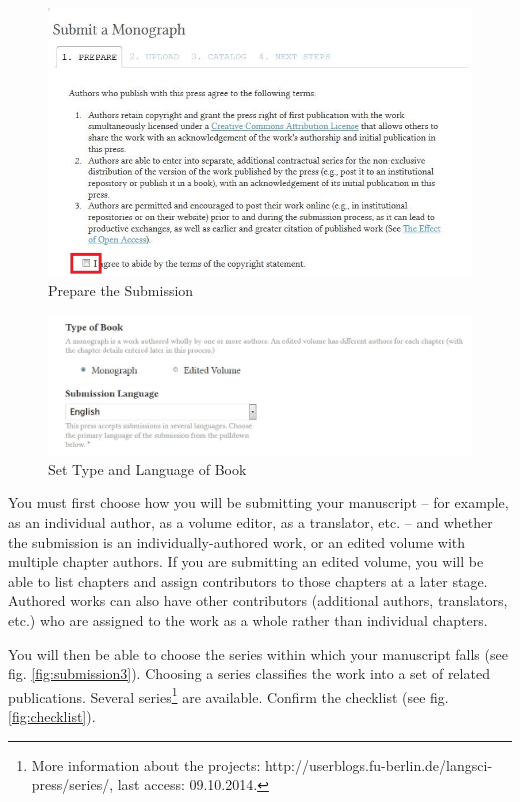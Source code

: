 \begin{figure}[h]
\centering
\includegraphics[width=1\textwidth]{./img/submission-1.jpg}
\caption{Prepare the Submission}
\label{fig:submission1}
\end{figure}

\begin{figure}[h]
\centering
\includegraphics[width=1\textwidth]{./img/submission-2.jpg}
\caption{Set Type and Language of Book}
\label{fig:submission2}
\end{figure}

You must first choose how you will be submitting your manuscript -- for example, as an individual author, as a volume editor, as a translator, etc. -- and whether the submission is an individually-authored work, or an edited volume with multiple chapter authors. If you are submitting an edited volume, you will be able to list chapters and assign contributors to those chapters at a later stage. Authored works can also have other contributors (additional authors, translators, etc.) who are assigned to the work as a whole rather than individual chapters.

\newpage

You will then be able to choose the series within which your manuscript falls (see fig. \ref{fig:submission3}). Choosing a series classifies the work into a set of related publications. Several series\footnote{More information about the projects: http://userblogs.fu-berlin.de/langsci-press/series/, last access: 09.10.2014.} are available. Confirm the checklist (see fig. \ref{fig:checklist}).

